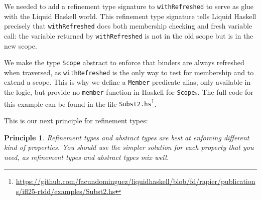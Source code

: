 \documentclass[sigconf, review]{acmart}
\newcommand{\tc}[1]{{\small\texttt{#1}}}
\newcommand{\sourcefile}[1]{\tc{#1}\footnote{\scriptsize\url{https://github.com/facundominguez/liquidhaskell/blob/fd/rapier/publications/ifl25-rtdd/examples/#1}}}
\newtheorem{principle}{Principle}
\begin{document}
We needed to add a refinement type signature to \tc{withRefreshed} to serve as
glue with the Liquid Haskell world. This refinement type signature tells Liquid
Haskell precisely that \tc{withRefreshed} does both membership checking and
fresh variable call: the variable returned by \tc{withRefreshed} is not in the
old scope but is in the new scope.

We make the type \tc{Scope} abstract to enforce that binders are always
refreshed when traversed, as \tc{withRefreshed} is the only
way to test for membership and to extend a scope. This is why we define a
\tc{Member} predicate alias, only available in the logic, but provide no
\tc{member} function in Haskell for \tc{Scope}s.
The full code for this example can be found in the
file \sourcefile{Subst2.hs}.

This is our next principle for refinement types:
\begin{principle}
  Refinement types and abstract types are best at enforcing different kind of
  properties. You should use the simpler solution for each property that you
  need, as refinement types and abstract types mix well.
\end{principle}




\end{document}
